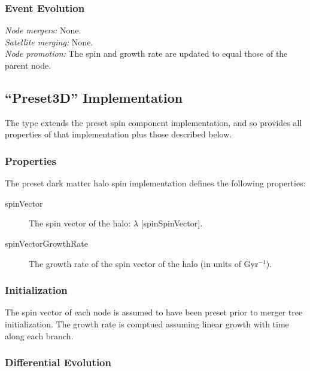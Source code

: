 \subsubsection{Event Evolution}

\noindent\emph{Node mergers:} None.\\

\noindent\emph{Satellite merging:} None.\\

\noindent\emph{Node promotion:} The spin and growth rate are updated to equal those of the parent node.\\

\subsection{``Preset3D'' Implementation}

The type extends the {\normalfont \ttfamily preset} spin component implementation, and so provides all properties of that implementation plus those described below.

\subsubsection{Properties}

The preset dark matter halo spin implementation defines the following properties:
\begin{description}
 \item [{\normalfont \ttfamily spinVector}] The spin vector of the halo: $\lambda$ [{\normalfont \ttfamily spinSpinVector}].
 \item [{\normalfont \ttfamily spinVectorGrowthRate}] The growth rate of the spin vector of the halo (in units of Gyr$^{-1}$).
\end{description}

\subsubsection{Initialization}

The spin vector of each \gls{node} is assumed to have been preset prior to merger tree initialization. The growth rate is comptued assuming linear growth with time along each branch.

\subsubsection{Differential Evolution}

